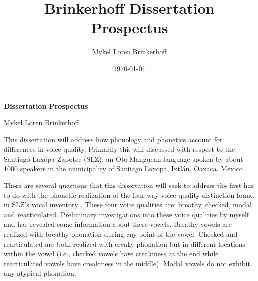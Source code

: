 \documentclass[12pt, letterpaper]{article}
\title{Brinkerhoff Dissertation Prospectus}
\author{Mykel Loren Brinkerhoff}
\date{\today}
\begin{document}

\onehalfspacing

\begin{center}
    {\Large \textbf{Dissertation Prospectus}}
    \vspace{6pt}

    Mykel Loren Brinkerhoff
\end{center}
\thispagestyle{fancy}



This dissertation will address how phonology and phonetics account for differences in voice quality. Primarily this will discussed with respect to the Santiago Laxopa Zapotec (SLZ), an Oto-Manguean language spoken by about 1000 speakers in the municipality of Santiago Laxopa, Ixtlán, Oaxaca, Mexico \citep{adlerAcousticsPhonationTypes2016,adlerDerivationVerbInitiality2018,brinkerhoffDownstepSantiagoLaxopaMFM,foleyForbiddenCliticClusters2018,SantiagoLaxopaEconomy,sichelFeaturalLifeNominals2020,silva-roblesElicitingAssociatedMotion2022}. 

There are several questions that this dissertation will seek to address the first has to do with the phonetic realization of the four-way voice quality distinction found in SLZ's vocal inventory \citep{adlerAcousticsPhonationTypes2016}. These four voice qualities are: breathy, checked, modal and rearticulated. Preliminary investigations into these voice qualities by myself and \citet{adlerAcousticsPhonationTypes2016} has revealed some information about these vowels. Breathy vowels are realized with breathy phonation during any point of the vowel. Checked and rearticulated are both realized with creaky phonation but in different locations within the vowel (i.e., checked vowels have creakiness at the end while rearticulated vowels have creakiness in the middle). Modal vowels do not exhibit any atypical phonation. 
\end{document}
